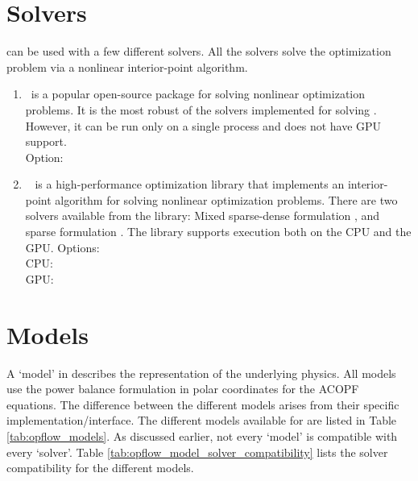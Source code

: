 \section{Solvers}\label{sec:opflow_solvers}
\opflow can be used with a few different solvers. All the solvers solve the optimization problem via a nonlinear interior-point algorithm.
\begin{enumerate}
  \item \ipopt~is a popular open-source package for solving nonlinear optimization problems. It is the most robust of the solvers implemented for solving \opflow. However, it can be run only on a single process and does not have GPU support. \\ Option:
   

  \item \hiop~ is a high-performance optimization library that implements an interior-point algorithm for solving nonlinear optimization problems. There are two solvers available from the \hiop library: Mixed sparse-dense formulation {}, and sparse formulation {}. The library supports execution both on the CPU and the GPU. Options: \\ CPU: {} {} {} \\ GPU:  {} {} 

\end{enumerate}

\section{Models}\label{sec:opflow_model}

A `model' in \exago describes the representation of the underlying physics. All \opflow models use the power balance formulation in polar coordinates for the ACOPF equations. The difference between the different models arises from their specific implementation/interface. The different models available for \opflow are listed in Table \ref{tab:opflow_models}. As discussed earlier, not every `model' is compatible with every `solver'. Table \ref{tab:opflow_model_solver_compatibility} lists the solver compatibility for the different models.

